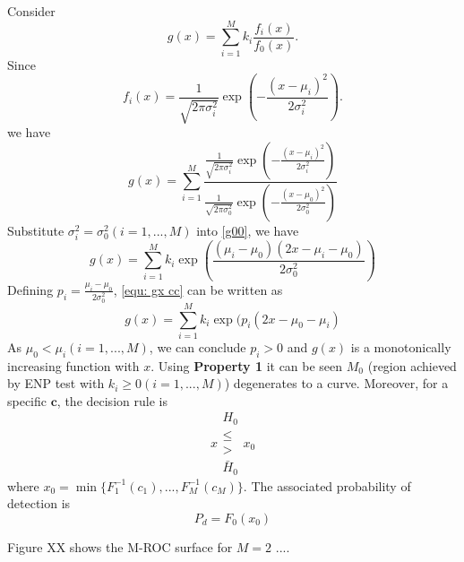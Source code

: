 Consider
\begin{equation}
\label{equ: define gx}
g(x) = \sum_{i=1}^{M}k_i\frac{f_i(x)}{f_0(x)}.
\end{equation}
Since 
\begin{equation}
\label{equ: gaussian PDF}
f_i(x) = \frac{1}{\sqrt{2\pi\sigma_i^2}}\exp(-\frac{(x-\mu_i)^2}{2\sigma_i^2}).
\end{equation}
we have
\begin{equation}
\label{g00}
g(x) = \sum_{i=1}^{M}\frac{\frac{1}{\sqrt{2\pi\sigma_i^2}}\exp(-\frac{(x-\mu_i)^2}{2\sigma_i^2})}{\frac{1}{\sqrt{2\pi\sigma_0^2}}\exp(-\frac{(x-\mu_0)^2}{2\sigma_0^2})}
\end{equation}
Substitute  $\sigma_i^2 = \sigma_0^2 (i = 1, ..., M)$ into \eqref{g00}, we have 
\begin{equation}
\label{equ: gx cc}
g(x) = \sum_{i=1}^{M}k_i\exp(\frac{(\mu_i - \mu_0)(2x-\mu_i - \mu_0)}{2\sigma_0^2})
\end{equation}
Defining $p_i = \frac{\mu_i - \mu_0}{2\sigma_0^2}$, \eqref{equ: gx cc} can be written as
\begin{equation}
g(x) = \sum_{i=1}^{M}k_i\exp(p_i(2x-\mu_0 - \mu_i)
\end{equation}
As $\mu_0 < \mu_i (i=1, ..., M)$, we can conclude $p_i >0$ and  $g(x)$ is a monotonically increasing function with $x$. Using \textbf{Property 1} it can be seen  $M_0$ (region achieved by ENP test with $k_i \geq 0 (i=1, ..., M)$) degenerates to a curve. Moreover, for a specific $\mathbf{c}$, the decision rule is 
\[
x \substack{H_0 \\ \leq \\ > \\ \bar{H}_0} x_0
\]
where $x_0 = \min\{F_1^{-1}(c_1), ..., F_M^{-1}(c_M)\}$. The associated probability of detection is
\[
P_d = F_0(x_0)
\]

Figure XX shows the M-ROC surface for $M=2$ ....
